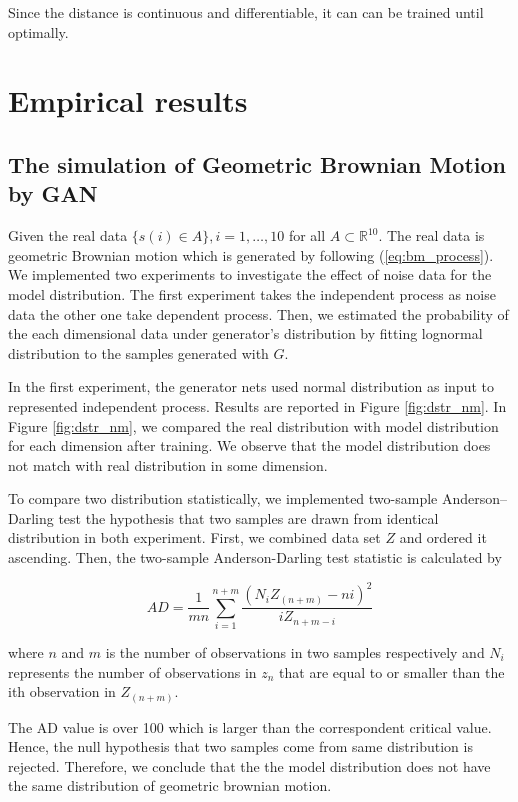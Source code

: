 \documentclass{article}
\begin{document}
	Since the distance is continuous and differentiable, it can can be trained until optimally. 
	
	
	\section{Empirical results}
	\subsection{The simulation of Geometric Brownian Motion by GAN}
	
	Given the real data $\{ s(i)\in A \}, i = 1, \dots, 10$ for all $A \subset \mathbb{R}^{10}$.
	The real data is geometric Brownian motion which is generated by following (\ref{eq:bm_process}).
	 We implemented two experiments to investigate the effect of noise data for the model distribution.
	The first experiment takes the independent process as noise data the other one take dependent process.
	Then, we estimated the probability of the each dimensional data under generator’s distribution by fitting lognormal distribution to the samples generated with $G$. 
		
	In the first experiment, the generator nets used normal distribution as input to represented independent process.
	Results are reported in Figure \ref{fig:dstr_nm}. 
	In Figure \ref{fig:dstr_nm}, we compared the real distribution with model distribution for each dimension after training. 
	We observe that the model distribution does not match with real distribution in some dimension. 
	
	To compare two distribution statistically, we implemented two-sample Anderson–Darling test the hypothesis that two samples are drawn from identical distribution in both experiment.
	First, we combined data set $Z$ and ordered it ascending.
	Then, the two-sample Anderson-Darling test statistic is calculated by
	
	\begin{equation}
	AD = \frac{1}{mn}\sum_{i=1}^{n+m}\frac{(N_iZ_{(n+m)}-ni)^2}{iZ_{n+m-i}}
	\end{equation}
	
	where $n$ and $m$ is the number of observations in two samples respectively and $N_i$ represents the number of observations in $z_n$ that are equal to or smaller
	than the ith observation in $Z_{(n+m)}$. 
	
	The AD value is over 100 which is larger than the correspondent critical value.  
	Hence, the null hypothesis that two samples come from same distribution is rejected. 
	Therefore, we conclude that the the model distribution does not have the same distribution of geometric brownian motion.
	
\end{document}
